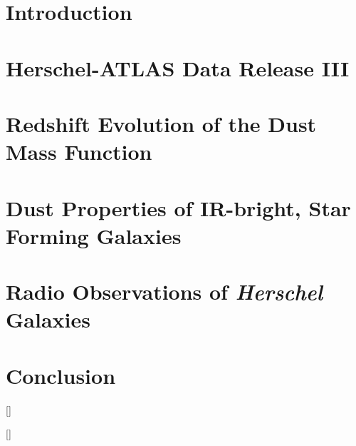 \documentclass[a4paper,12pt,twoside,openany,dalthesis]{report}
\begin{document}
\chapter{Introduction}
\label{chapter:Introduction}


\chapter{Herschel-ATLAS Data Release III}
\label{chapter:Data_Release_3}


\chapter{Redshift Evolution of the Dust Mass Function}
\label{chapter:Dust_Mass_Functions}


\chapter{Dust Properties of IR-bright, Star Forming Galaxies}
\label{chapter:Dust_Evolution}


\chapter{Radio Observations of \textit{Herschel} Galaxies}
\label{chapter:Radio_Identifications}


\chapter{Conclusion}
\label{chapter:Conclusion}


\appendix


[\titlerule\vspace{2pt}\titlerule]


\label{app:candidate_lenses_bright}


\label{app:HerBS_photometry}


\label{app:HerBS_SEDs}


\label{app:SPT_DSFG_SEDs}

\titleformat{\chapter}[display]{}{}{0pt}{\huge \textbf \textsc}[\titlerule\vspace{2pt}\titlerule]
%





\end{document}
